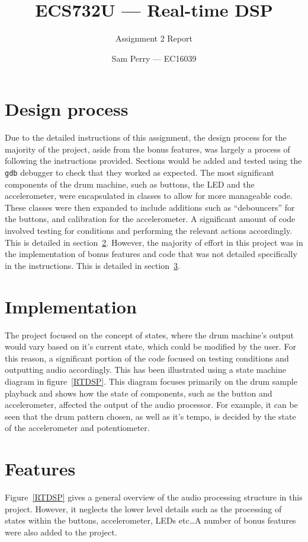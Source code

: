 \documentclass[titlepage]{scrartcl}
\begin{document}
\title{ECS732U --- Real-time DSP}
\subtitle{\LARGE{Assignment 2 Report}}
\author{Sam Perry --- EC16039}

\maketitle

\section{Design process}
Due to the detailed instructions of this assignment, the design process for the
majority of the project, aside from the bonus features, was largely a process
of following the instructions provided. Sections would be added and tested
using the \texttt{gdb} debugger to check that they worked as expected. The most
significant components of the drum machine, such as buttons, the LED and the
accelerometer, were encapsulated in classes to allow for more manageable code.
These classes were then expanded to include additions such as ``debouncers''
for the buttons, and calibration for the accelerometer. A significant amount of
code involved testing for conditions and performing the relevant actions
accordingly. This is detailed in section~\ref{Implementation}. However, the
majority of effort in this project was in the implementation of bonus features
and code that was not detailed specifically in the instructions. This is
detailed in section~\ref{Features}.

\section{Implementation}\label{Implementation}
The project focused on the concept of states, where the drum machine's output
would vary based on it's current state, which could be modified by the user.
For this reason, a significant portion of the code focused on testing
conditions and outputting audio accordingly. This has been illustrated using a
state machine diagram in figure~\ref{RTDSP}. This diagram focuses primarily on
the drum sample playback and shows how the state of components, such as the
button and accelerometer, affected the output of the audio processor. For
example, it can be seen that the drum pattern chosen, as well as it's tempo,
is decided by the state of the accelerometer and potentiometer.

\section{Features}\label{Features}
Figure~\ref{RTDSP} gives a general overview of the audio processing structure
in this project. However, it neglects the lower level details such as the
processing of states within the buttons, accelerometer, LEDs etc\ldots A number of
bonus features were also added to the project.
\end{document}
